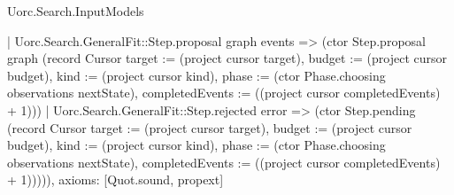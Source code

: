 \begin{lexlean}{Uorc.Search.InputModels}
\begin{semanticmodule}
{      | Uorc.Search.GeneralFit::Step.proposal graph events => (ctor Step.proposal graph (record Cursor {target := (project cursor target), budget := (project cursor budget), kind := (project cursor kind), phase := (ctor Phase.choosing observations nextState), completedEvents := ((project cursor completedEvents) + 1)}))
      | Uorc.Search.GeneralFit::Step.rejected error => (ctor Step.pending (record Cursor {target := (project cursor target), budget := (project cursor budget), kind := (project cursor kind), phase := (ctor Phase.choosing observations nextState), completedEvents := ((project cursor completedEvents) + 1)})))),
  axioms: [Quot.sound, propext]
}
\end{semanticmodule}
\end{lexlean}
